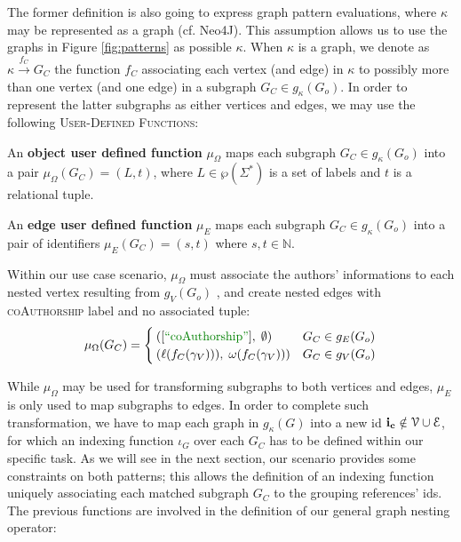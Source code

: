The former definition is also going to express graph pattern evaluations, where $\kappa$ may be represented as a graph (cf. Neo4J). This assumption allows us to use the graphs in Figure \ref{fig:patterns} as possible $\kappa$. When $\kappa$ is a graph, we denote as $\kappa\xrightarrow{f_C} G_C$ the function $f_C$ associating  each vertex (and edge) in $\kappa$ to possibly more than one vertex (and one edge) in a subgraph $G_C\in g_\kappa(G_o)$. In order to represent the latter subgraphs  as either vertices and edges, we may use
the following \textsc{User-Defined Functions}:
\begin{definition}
	An \textbf{object user defined function} $\mu_\Omega$ maps each subgraph $G_C\in g_\kappa(G_o)$ into a pair $\mu_\Omega(G_C)=(L,t)$, where $L\in\wp(\Sigma^*)$ is a set of labels and $t$ is a relational tuple.
	
	An \textbf{edge user defined function} $\mu_E$ maps each subgraph $G_C\in g_\kappa(G_o)$ into a pair of identifiers $\mu_E(G_C)=(s,t)$ where $s,t\in\mathbb{N}$.
\end{definition}

\begin{example}
	Within our use case scenario, $\mu_\Omega$  must associate  the authors' informations to each nested vertex resulting from $g_{V}(G_{o})$ , and create nested edges with \textsc{coAuthorship} label and no associated tuple:
	\[\mu_\Omega(G_C)=\begin{cases}
	([\mstr{coAuthorship}],\;\emptyset) & G_C \in g_E(G_{o})\\
	(\ell(f_C(\gamma_V))),\;\omega(f_C(\gamma_V))) & G_C \in g_V(G_{o})\\
	\end{cases}\]
\end{example}

While $\mu_\Omega$ may be used for transforming subgraphs to both vertices and edges, $\mu_E$ is only used to map subgraphs to edges.  
In order to complete such transformation, we have to map each graph in $g_\kappa(G)$ into a new id $\textbf{i}_{\textbf{c}}\notin \mathcal{V}\cup \mathcal{E}$, for which an indexing function $\iota_G$ over each $G_C$ has to be defined within our specific task. As we will see in the next section, our scenario provides some constraints on both patterns; this allows the definition of an indexing function  uniquely associating each matched subgraph  $G_C$  to the grouping references' ids.
The previous functions are involved in the definition of our general graph nesting operator:



